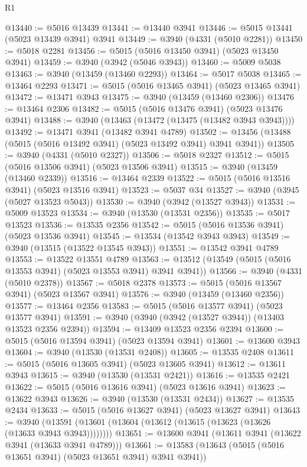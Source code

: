 \begin{lexlean}{R1}
\begin{coremodule}
@13440 := @5016 @13439
@13441 := @13440 @3941
@13446 := @5015 @13441 (@5023 @13439 @3941) @3941
@13449 := @3940 (@4331 (@5010 @2281))
@13450 := @5018 @2281
@13456 := @5015 (@5016 @13450 @3941) (@5023 @13450 @3941)
@13459 := @3940 (@3942 (@5046 @3943))
@13460 := @5009 @5038
@13463 := @3940 (@13459 (@13460 @2293))
@13464 := @5017 @5038
@13465 := @13464 @2293
@13471 := @5015 (@5016 @13465 @3941) (@5023 @13465 @3941)
@13472 := @13471 @3943
@13475 := @3940 (@13459 (@13460 @2306))
@13476 := @13464 @2306
@13482 := @5015 (@5016 @13476 @3941) (@5023 @13476 @3941)
@13488 := @3940 (@13463 (@13472 (@13475 (@13482 @3943 @3943))))
@13492 := @13471 @3941 (@13482 @3941 @4789)
@13502 := @13456 (@13488 (@5015 (@5016 @13492 @3941) (@5023 @13492 @3941) @3941 @3941))
@13505 := @3940 (@4331 (@5010 @2327))
@13506 := @5018 @2327
@13512 := @5015 (@5016 @13506 @3941) (@5023 @13506 @3941)
@13515 := @3940 (@13459 (@13460 @2339))
@13516 := @13464 @2339
@13522 := @5015 (@5016 @13516 @3941) (@5023 @13516 @3941)
@13523 := @5037 @34
@13527 := @3940 (@3945 (@5027 @13523 @5043))
@13530 := @3940 (@3942 (@13527 @3943))
@13531 := @5009 @13523
@13534 := @3940 (@13530 (@13531 @2356))
@13535 := @5017 @13523
@13536 := @13535 @2356
@13542 := @5015 (@5016 @13536 @3941) (@5023 @13536 @3941)
@13545 := @13534 (@13542 @3943 @3943)
@13549 := @3940 (@13515 (@13522 @13545 @3943))
@13551 := @13542 @3941 @4789
@13553 := @13522 @13551 @4789
@13563 := @13512 (@13549 (@5015 (@5016 @13553 @3941) (@5023 @13553 @3941) @3941 @3941))
@13566 := @3940 (@4331 (@5010 @2378))
@13567 := @5018 @2378
@13573 := @5015 (@5016 @13567 @3941) (@5023 @13567 @3941)
@13576 := @3940 (@13459 (@13460 @2356))
@13577 := @13464 @2356
@13583 := @5015 (@5016 @13577 @3941) (@5023 @13577 @3941)
@13591 := @3940 (@3940 (@3942 (@13527 @3944)) (@13403 @13523 @2356 @2394))
@13594 := @13409 @13523 @2356 @2394
@13600 := @5015 (@5016 @13594 @3941) (@5023 @13594 @3941)
@13601 := @13600 @3943
@13604 := @3940 (@13530 (@13531 @2408))
@13605 := @13535 @2408
@13611 := @5015 (@5016 @13605 @3941) (@5023 @13605 @3941)
@13612 := @13611 @3943
@13615 := @3940 (@13530 (@13531 @2421))
@13616 := @13535 @2421
@13622 := @5015 (@5016 @13616 @3941) (@5023 @13616 @3941)
@13623 := @13622 @3943
@13626 := @3940 (@13530 (@13531 @2434))
@13627 := @13535 @2434
@13633 := @5015 (@5016 @13627 @3941) (@5023 @13627 @3941)
@13643 := @3940 (@13591 (@13601 (@13604 (@13612 (@13615 (@13623 (@13626 (@13633 @3943 @3943))))))))
@13651 := @13600 @3941 (@13611 @3941 (@13622 @3941 (@13633 @3941 @4789)))
@13661 := @13583 (@13643 (@5015 (@5016 @13651 @3941) (@5023 @13651 @3941) @3941 @3941))

\end{coremodule}
\end{lexlean}
